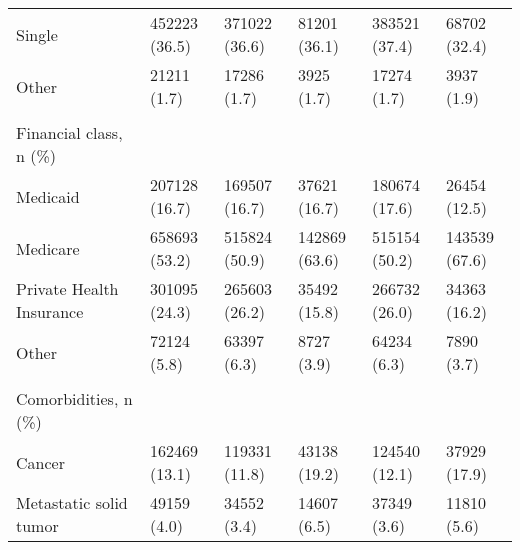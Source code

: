\begin{adjustbox}{width={\textwidth},totalheight={\textheight},keepaspectratio,frame}
{\begin{tabular}{L{20em}C{10em}C{10em}C{10em}C{10em}C{10em}}
\hspace{3mm}                    Single &      452223 (36.5) &                 371022 (36.6) &              81201 (36.1) &                  383521 (37.4) &              68702 (32.4) \\
\hspace{3mm}                     Other &        21211 (1.7) &                   17286 (1.7) &                3925 (1.7) &                    17274 (1.7) &                3937 (1.9) \\
&                 &                            &                        &                             &                        \\
Financial class, n (\%) &                 &                            &                        &                             &                        \\
\hspace{3mm}                   Medicaid &      207128 (16.7) &                 169507 (16.7) &              37621 (16.7) &                  180674 (17.6) &              26454 (12.5) \\
\hspace{3mm}                   Medicare &      658693 (53.2) &                 515824 (50.9) &             142869 (63.6) &                  515154 (50.2) &             143539 (67.6) \\
\hspace{3mm}   Private Health Insurance &      301095 (24.3) &                 265603 (26.2) &              35492 (15.8) &                  266732 (26.0) &              34363 (16.2) \\
\hspace{3mm}                      Other &        72124 (5.8) &                   63397 (6.3) &                8727 (3.9) &                    64234 (6.3) &                7890 (3.7) \\
&                 &                            &                        &                             &                        \\
Comorbidities, n (\%) &                 &                            &                        &                             &                        \\
\hspace{3mm}                     Cancer &      162469 (13.1) &                 119331 (11.8) &              43138 (19.2) &                  124540 (12.1) &              37929 (17.9) \\
\hspace{3mm}     Metastatic solid tumor &        49159 (4.0) &                   34552 (3.4) &               14607 (6.5) &                    37349 (3.6) &               11810 (5.6) \\

\end{tabular}}
\end{adjustbox}
